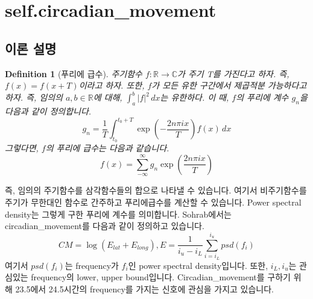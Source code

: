 \documentclass{oblivoir}
\newtheorem{definition}{Definition}
\begin{document}
  \section{self.circadian\_movement}
  \subsection{이론 설명}
  \begin{definition}[푸리에 급수]
    주기함수 $f:\mathbb{R}\to\mathbb{C}$가 주기 T를 가진다고 하자. 즉, $f(x)=f(x+T)$이라고 하자.
    또한, $f$가 모든 유한 구간에서 제곱적분 가능하다고 하자. 즉, 임의의 $a,b\in\mathbb{R}$에 대해, $\int_{a}^b{\left\vert f\right\vert^2}\,dx$는 유한하다.
    이 때, $f$의 푸리에 계수 $g_n$을 다음과 같이 정의합니다.
    \[g_n=\frac{1}{T}\int_{t_0}^{t_0+T}{\exp(-\frac{2n\pi ix}{T})f(x)}\,dx\]
    그렇다면, $f$의 푸리에 급수는 다음과 같습니다.
    \[f(x)=\sum_{-\infty}^{\infty}{g_n\exp(\frac{2n\pi ix}{T})}\]
  \end{definition}
  즉, 임의의 주기함수를 삼각함수들의 합으로 나타낼 수 있습니다.
  여기서 비주기함수를 주기가 무한대인 함수로 간주하고 푸리에급수를 계산할 수 있습니다.
  Power spectral density는 그렇게 구한 푸리에 계수를 의미합니다.\newline
  Sohrab\cite{Sohrab}에서는 circadian\_movement를 다음과 같이 정의하고 있습니다.
  \[CM=\log(E_{lat}+E_{long}),E=\frac{1}{i_u-i_L}\sum_{i=i_L}^{i_u}{psd(f_i)}\]
  여기서 $psd(f_i)$는 frequency가 $f_i$인 power spectral density입니다.
  또한, $i_L,i_u$는 관심있는 frequency의 lower, upper bound입니다.
  Circadian\_movement를 구하기 위해 23.5에서 24.5시간의 frequency를 가지는 신호에 관심을 가지고 있습니다.
\end{document}
